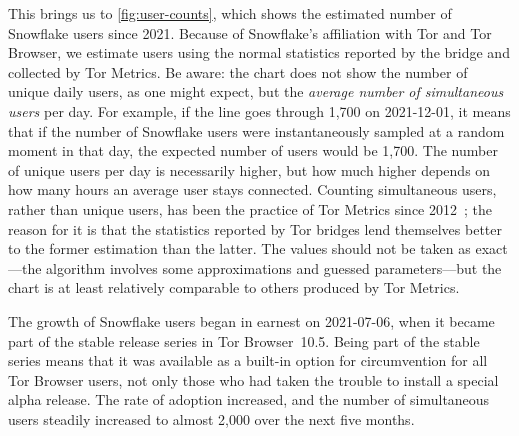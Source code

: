 \documentclass[letterpaper,twocolumn]{article}
\begin{document}
This brings us to \autoref{fig:user-counts},
which shows the estimated number of Snowflake users since 2021.
Because of Snowflake's affiliation with Tor and Tor Browser,
we estimate users using the normal statistics reported by the bridge
and collected by Tor Metrics.
Be aware: the chart does not show the number of unique daily users,
as one might expect,
but the \emph{average number of simultaneous users} per day.
For example, if the line goes through 1,700 on 2021-12-01,
it means that if the number of Snowflake users were instantaneously sampled
at a random moment in that day, the expected number of users would be 1,700.
The number of unique users per day is necessarily higher,
but how much higher depends on how many hours an average user stays connected.
Counting simultaneous users, rather than unique users,
has been the practice of Tor Metrics since 2012~\cite{tor-tr-2012-10-001};
the reason for it is that the statistics reported by Tor bridges
lend themselves better to the former estimation than the latter.
The values should not be taken as exact---the
algorithm involves some approximations and guessed parameters---but
the chart is at least relatively comparable to others
produced by Tor Metrics.

The growth of Snowflake users began in earnest on
\mbox{2021-07-06}, when it became part of the stable release series
in Tor Browser~10.5.
Being part of the stable series means that it was
available as a built-in option for circumvention for all Tor Browser users,
not only those who had taken the trouble to install a special alpha release.
The rate of adoption increased,
and the number of simultaneous users steadily increased to almost 2,000
over the next five months.
\end{document}
